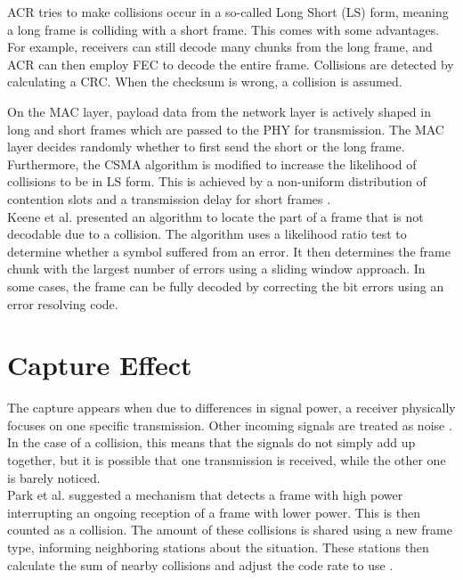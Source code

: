 \gls{ACR} \cite{wu2010} tries to make collisions occur in a so-called Long Short (LS) form, meaning a long frame is colliding with a short frame. This comes with some advantages. For example, receivers can still decode many chunks from the long frame, and \gls{ACR} can then employ \gls{FEC} to decode the entire frame. Collisions are detected by calculating a \gls{CRC}. When the checksum is wrong, a collision is assumed.

On the \gls{MAC} layer, payload data from the network layer is actively shaped in long and short frames which are passed to the \gls{PHY} for transmission. The \gls{MAC} layer decides randomly whether to first send the short or the long frame. Furthermore, the \gls{CSMA} algorithm is modified to increase the likelihood of collisions to be in LS form. This is achieved by a non-uniform distribution of contention slots and a transmission delay for short frames \cite{wu2010}.\\

Keene et al. \cite{keene2010} presented an algorithm to locate the part of a frame that is not decodable due to a collision. The algorithm uses a likelihood ratio test to determine whether a symbol suffered from an error. It then determines the frame chunk with the largest number of errors using a sliding window approach. In some cases, the frame can be fully decoded by correcting the bit errors using an error resolving code.



\section{Capture Effect}\label{sec:related-capture}

The capture appears when due to differences in signal power, a receiver physically focuses on one specific transmission. Other incoming signals are treated as noise \cite{kim1999}. In the case of a collision, this means that the signals do not simply add up together, but it is possible that one transmission is received, while the other one is barely noticed.\\

Park et al. suggested a mechanism that detects a frame with high power interrupting an ongoing reception of a frame with lower power. This is then counted as a collision. The amount of these collisions is shared using a new frame type, informing neighboring stations about the situation. These stations then calculate the sum of nearby collisions and adjust the code rate to use \cite{park2009}.\\

